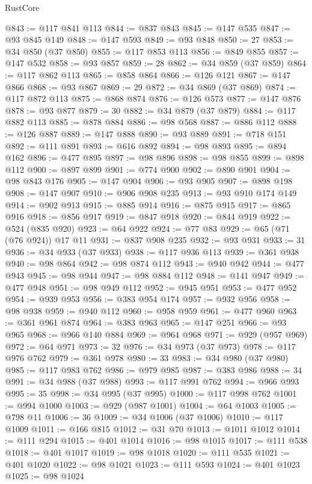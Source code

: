 \begin{lexlean}{RustCore}
\begin{coremodule}
@843 := @117 @841 @113
@844 := @837 @843
@845 := @147 @535
@847 := @93 @845 @149
@848 := @147 @593
@849 := @93 @848
@850 := 27
@853 := @34 @850 (@37 @850)
@855 := @117 @853 @113
@856 := @849 @855
@857 := @147 @532
@858 := @93 @857
@859 := 28
@862 := @34 @859 (@37 @859)
@864 := @117 @862 @113
@865 := @858 @864
@866 := @126 @121
@867 := @147 @866
@868 := @93 @867
@869 := 29
@872 := @34 @869 (@37 @869)
@874 := @117 @872 @113
@875 := @868 @874
@876 := @126 @573
@877 := @147 @876
@878 := @93 @877
@879 := 30
@882 := @34 @879 (@37 @879)
@884 := @117 @882 @113
@885 := @878 @884
@886 := @98 @568
@887 := @886 @112
@888 := @126 @887
@889 := @147 @888
@890 := @93 @889
@891 := @718 @151
@892 := @111 @891
@893 := @616 @892
@894 := @98 @893
@895 := @894 @162
@896 := @477 @895
@897 := @98 @896
@898 := @98 @855
@899 := @898 @112
@900 := @897 @899
@901 := @774 @900
@902 := @890 @901
@904 := @98 @843 @176
@905 := @147 @904
@906 := @93 @905
@907 := @898 @198
@908 := @147 @907
@910 := @906 @908 @235
@913 := @93 @910 @174 @149
@914 := @902 @913
@915 := @885 @914
@916 := @875 @915
@917 := @865 @916
@918 := @856 @917
@919 := @847 @918
@920 := @844 @919
@922 := @524 (@835 @920)
@923 := @64 @922
@924 := @77 @83
@929 := @65 (@71 (@76 @924)) @17 @11
@931 := @837 @908 @235
@932 := @93 @931
@933 := 31
@936 := @34 @933 (@37 @933)
@938 := @117 @936 @113
@939 := @361 @938
@940 := @98 @864
@942 := @98 @874 @112
@943 := @940 @942
@944 := @477 @943
@945 := @98 @944
@947 := @98 @884 @112
@948 := @141 @947
@949 := @477 @948
@951 := @98 @949 @112
@952 := @945 @951
@953 := @477 @952
@954 := @939 @953
@956 := @383 @954 @174
@957 := @932 @956
@958 := @98 @938
@959 := @940 @112
@960 := @958 @959
@961 := @477 @960
@963 := @361 @961 @874
@964 := @383 @963
@965 := @147 @251
@966 := @93 @965
@968 := @966 @140 @884
@969 := @964 @968
@971 := @929 (@957 @969)
@972 := @64 @971
@973 := 32
@976 := @34 @973 (@37 @973)
@978 := @117 @976 @762
@979 := @361 @978
@980 := 33
@983 := @34 @980 (@37 @980)
@985 := @117 @983 @762
@986 := @979 @985
@987 := @383 @986
@988 := 34
@991 := @34 @988 (@37 @988)
@993 := @117 @991 @762
@994 := @966 @993
@995 := 35
@998 := @34 @995 (@37 @995)
@1000 := @117 @998 @762
@1001 := @994 @1000
@1003 := @929 (@987 @1001)
@1004 := @64 @1003
@1005 := @798 @11
@1006 := 36
@1009 := @34 @1006 (@37 @1006)
@1010 := @117 @1009
@1011 := @166 @815
@1012 := @31 @70
@1013 := @1011 @1012
@1014 := @111 @294
@1015 := @401 @1014
@1016 := @98 @1015
@1017 := @111 @538
@1018 := @401 @1017
@1019 := @98 @1018
@1020 := @111 @535
@1021 := @401 @1020
@1022 := @98 @1021
@1023 := @111 @593
@1024 := @401 @1023
@1025 := @98 @1024

\end{coremodule}
\end{lexlean}
